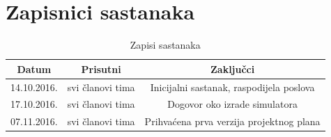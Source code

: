 \documentclass[times, utf8, numeric]{fer}
\begin{document}
\section{Zapisnici sastanaka}
\begin{table}[H]
\centering
 \begin{tabular}{||c c c||} 
 \hline
 Datum & Prisutni & Zaključci\\ [0.5ex] 
 \hline\hline
 14.10.2016. & svi članovi tima & Inicijalni sastanak, raspodijela poslova\\
 17.10.2016. & svi članovi tima & Dogovor oko izrade simulatora\\
 07.11.2016. & svi članovi tima & Prihvaćena prva verzija projektnog plana\\
 \hline
 \end{tabular}
 \caption{Zapisi sastanaka}
\end{table}
\end{document}
